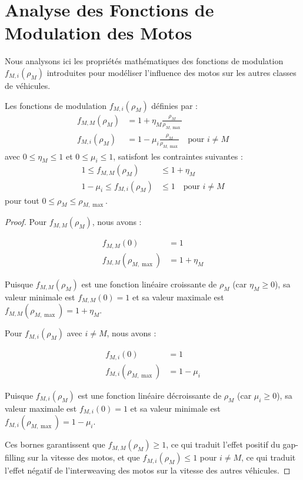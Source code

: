 \section{Analyse des Fonctions de Modulation des Motos}
\label{sec:analyse_fonctions}

Nous analysons ici les propriétés mathématiques des fonctions de modulation $f_{M,i}(\rho_M)$ introduites pour modéliser l'influence des motos sur les autres classes de véhicules.

\begin{theorem}
Les fonctions de modulation $f_{M,i}(\rho_M)$ définies par :
\begin{align}
f_{M,M}(\rho_M) &= 1 + \eta_M \frac{\rho_M}{\rho_{M,\max}}\\
f_{M,i}(\rho_M) &= 1 - \mu_i \frac{\rho_M}{\rho_{M,\max}} \quad \text{pour } i \neq M
\end{align}
avec $0 \leq \eta_M \leq 1$ et $0 \leq \mu_i \leq 1$, satisfont les contraintes suivantes :
\begin{align}
1 \leq f_{M,M}(\rho_M) &\leq 1 + \eta_M\\
1 - \mu_i \leq f_{M,i}(\rho_M) &\leq 1 \quad \text{pour } i \neq M
\end{align}
pour tout $0 \leq \rho_M \leq \rho_{M,\max}$.
\end{theorem}

\begin{proof}
Pour $f_{M,M}(\rho_M)$, nous avons :

\begin{align}
f_{M,M}(0) &= 1\\
f_{M,M}(\rho_{M,\max}) &= 1 + \eta_M
\end{align}

Puisque $f_{M,M}(\rho_M)$ est une fonction linéaire croissante de $\rho_M$ (car $\eta_M \geq 0$), sa valeur minimale est $f_{M,M}(0) = 1$ et sa valeur maximale est $f_{M,M}(\rho_{M,\max}) = 1 + \eta_M$.

Pour $f_{M,i}(\rho_M)$ avec $i \neq M$, nous avons :

\begin{align}
f_{M,i}(0) &= 1\\
f_{M,i}(\rho_{M,\max}) &= 1 - \mu_i
\end{align}

Puisque $f_{M,i}(\rho_M)$ est une fonction linéaire décroissante de $\rho_M$ (car $\mu_i \geq 0$), sa valeur maximale est $f_{M,i}(0) = 1$ et sa valeur minimale est $f_{M,i}(\rho_{M,\max}) = 1 - \mu_i$.

Ces bornes garantissent que $f_{M,M}(\rho_M) \geq 1$, ce qui traduit l'effet positif du gap-filling sur la vitesse des motos, et que $f_{M,i}(\rho_M) \leq 1$ pour $i \neq M$, ce qui traduit l'effet négatif de l'interweaving des motos sur la vitesse des autres véhicules.
\end{proof}

